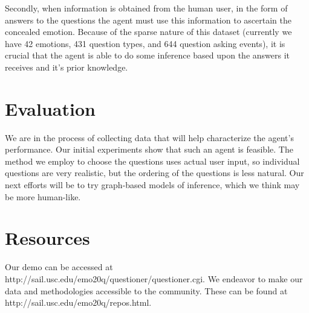 \documentclass[a4paper]{llncs}
\begin{document}
Secondly, when information is obtained from the human user, in the form of
answers to the questions the agent must use this information to ascertain the
concealed emotion.  Because of the sparse nature of this dataset (currently we
have 42 emotions, 431 question types, and 644 question asking events), it is
crucial that the agent is able to do some inference based upon the answers it
receives and it's prior knowledge.


\section{Evaluation}

We are in the process of collecting data that will help characterize the agent's
performance.  Our initial experiments show that such an agent is feasible.
The method we employ to choose the questions uses actual user input, so
individual questions are very realistic, but the ordering of the questions is
less natural. Our next efforts will be to try graph-based models of inference,
which we think may be more human-like.

\section{Resources}

Our demo can be accessed at
http://sail.usc.edu/emo20q/questioner/questioner.cgi. We endeavor to make our data
and methodologies accessible to the community.  These can be found at
http://sail.usc.edu/emo20q/repos.html.





\end{document}
